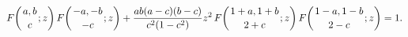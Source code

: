 \[\mathop{F\/}\nolimits\!\left({a,b\atop c};z\right)\mathop{F\/}\nolimits\!\left%
({-a,-b\atop-c};z\right)+\frac{ab(a-c)(b-c)}{c^{2}(1-c^{2})}z^{2}\mathop{F\/}%
\nolimits\!\left({1+a,1+b\atop 2+c};z\right)\mathop{F\/}\nolimits\!\left({1-a,%
1-b\atop 2-c};z\right)=1.\]
